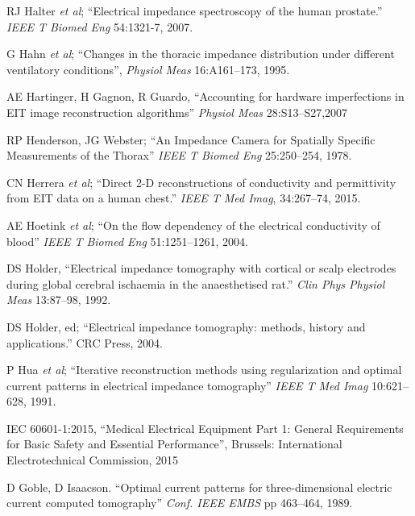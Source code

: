 \documentclass[12pt]{article} \usepackage[margin=3cm]{geometry} \usepackage[margin=20pt,font=small,labelfont=bf]{caption}\def\TBLWIDA{35mm}\def\TBLWIDB{95mm}
\newcommand{\ifmaxthree}[2]{#2 {\em et al}; }
\begin{document}
\begin{thebibliography}{00}
\ifmaxthree{
RJ Halter, A Hartov, JA Heaney, KD Paulsen, AR Schned
}{
RJ Halter
}
``Electrical impedance spectroscopy of the human prostate.''
{\em IEEE T Biomed Eng} 54:1321-7, 2007. %

\ifmaxthree{
Hahn G, Šipinková I, Baisch F, Hellige G.
}{
G Hahn
}
``Changes in the thoracic impedance distribution under different ventilatory conditions'',
{\em Physiol Meas} 16:A161--173, 1995.

AE Hartinger, H Gagnon, R Guardo,
``Accounting for hardware imperfections in EIT image reconstruction algorithms''
{\em  Physiol Meas} 28:S13--S27,2007

RP Henderson, JG Webster;
``An Impedance Camera for Spatially Specific Measurements of the Thorax''
{\em IEEE T Biomed Eng} 25:250--254, 1978.

\ifmaxthree{
CN Herrera, MF Vallejo, JL Mueller, RG Lima;
}{
CN Herrera
}
``Direct 2-D reconstructions of conductivity and permittivity from EIT data on a human chest.''
{\em IEEE T Med Imag}, 34:267--74, 2015.

\ifmaxthree{
AE Hoetink, TJ Faes, KR Visser, RM Heethaar,
}{
AE Hoetink
}
``On the flow dependency of the electrical conductivity of blood''
{\em  IEEE T Biomed Eng} 51:1251--1261, 2004.

DS Holder,
``Electrical impedance tomography with cortical or scalp electrodes during global cerebral ischaemia in the anaesthetised rat.''
{\em Clin Phys Physiol Meas} 13:87--98, 1992. %

DS Holder, ed;
``Electrical impedance tomography: methods, history and applications.''
CRC Press, 2004.


\ifmaxthree{
P Hua, EJ Woo, JG Webster,  WJ Tompkins,
}{
P Hua
}
``Iterative reconstruction methods using regularization and optimal current patterns in electrical impedance tomography''
{\em  IEEE T Med Imag} 10:621--628, 1991.

IEC 60601-1:2015,
 ``Medical Electrical Equipment Part 1:  General Requirements for
Basic Safety and Essential Performance'',
Brussels: International Electrotechnical Commission, 2015

D Goble, D Isaacson.
``Optimal current patterns for three-dimensional electric current computed tomography''
{\em Conf. IEEE EMBS} pp 463--464, 1989.


\end{thebibliography}
\end{document}

